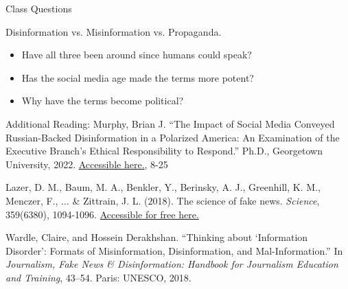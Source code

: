 \documentclass[nobackground,dvipsnames,table]{beamer}
\begin{document}
\begin{frame}{Class Questions}

\begin{minipage}{0.46\textwidth}
    \small{
        Disinformation vs. Misinformation vs. Propaganda.
        \begin{itemize}
            \item Have all three been around since humans could speak?
            \item Has the social media age made the terms more potent?
            \item Why have the terms become political?
        \end{itemize}
    }
\end{minipage}
\hspace{0.05\textwidth}
\begin{minipage}{0.47\textwidth}
\tiny{
    Additional Reading:
    Murphy, Brian J. “The Impact of Social Media Conveyed Russian-Backed Disinformation in a Polarized America: An Examination of the Executive Branch’s Ethical Responsibility to Respond.” Ph.D., Georgetown University, 2022. \href{https://www.proquest.com/docview/2760166084/abstract/9EE61E3EE4184D8BPQ/1}{Accessible here.}, 8-25 \newline 
    
    Lazer, D. M., Baum, M. A., Benkler, Y., Berinsky, A. J., Greenhill, K. M., Menczer, F., ... \& Zittrain, J. L. (2018). The science of fake news. \emph{Science}, 359(6380), 1094-1096. \href{https://www.science.org/doi/full/10.1126/science.aao2998}{Accessible for free here.} \newline 
    
    Wardle, Claire, and Hossein Derakhshan. “Thinking about ‘Information Disorder’: Formats of Misinformation, Disinformation, and Mal-Information.” In \emph{Journalism, Fake News \& Disinformation: Handbook for Journalism Education and Training}, 43–54. Paris: UNESCO, 2018. 
}
\end{minipage}
\end{frame}
\end{document}
